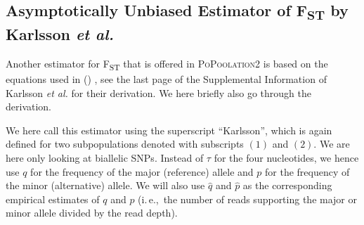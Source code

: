 \documentclass[letterpaper,fontsize=9pt,DIV=12]{scrartcl}
\newcommand\citeay[1]{\citeauthor{#1} (\citeyear{#1}) \cite{#1}}
\newcommand\toolname{\textsc}
\newcommand{\fst}{F\textsubscript{ST}}
\newcommand{\ie}{i.\,e.,~}
\begin{document}


\subsection{Asymptotically Unbiased Estimator of \texorpdfstring{\fst}{FST} by Karlsson \textit{et al.}}
\label{supp:sec:FST:sub:Karlsson}

Another estimator for \fst{} that is offered in \toolname{PoPoolation2} is based on the equations used in \citeay{Karlsson2007}, see the last page of the Supplemental Information of Karlsson \textit{et al.} for their derivation.
We here briefly also go through the derivation.

We here call this estimator using the superscript ``Karlsson'', which is again defined for two subpopulations denoted with subscripts $(1)$ and $(2)$.
We are here only looking at biallelic SNPs.
Instead of $\tau$ for the four nucleotides, we hence use $q$ for the frequency of the major (reference) allele and $p$ for the frequency of the minor (alternative) allele.  We will also use $\widehat{q}$ and $\widehat{p}$ as the corresponding empirical estimates of $q$ and $p$ (\ie the number of reads supporting the major or minor allele divided by the read depth).
\end{document}
